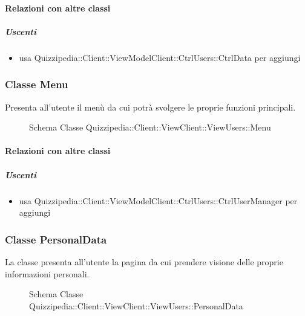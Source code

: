 \paragraph{Relazioni con altre classi}
\subparagraph{Uscenti}
\begin{itemize}
\item usa Quizzipedia::Client::ViewModelClient::CtrlUsers::CtrlData per aggiungi
\end{itemize}
\subsubsection{Classe Menu}
Presenta all'utente il menù da cui potrà svolgere le proprie funzioni principali.
\begin{figure}[H]
\centering
\noindent{}
\caption[Schema Classe Menu]{Schema Classe Quizzipedia::Client::ViewClient::ViewUsers::Menu}
\end{figure}
\paragraph{Relazioni con altre classi}
\subparagraph{Uscenti}
\begin{itemize}
\item usa Quizzipedia::Client::ViewModelClient::CtrlUsers::CtrlUserManager per aggiungi
\end{itemize}
\subsubsection{Classe PersonalData}
La classe presenta all'utente la pagina da cui prendere visione delle proprie informazioni personali.
\begin{figure}[H]
\centering
\noindent{}
\caption[Schema Classe PersonalData]{Schema Classe Quizzipedia::Client::ViewClient::ViewUsers::PersonalData}
\end{figure}
